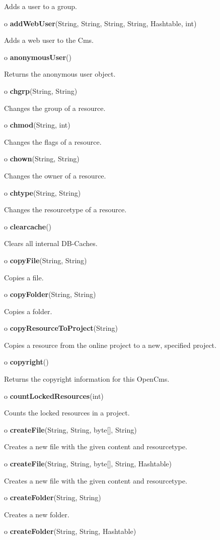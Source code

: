 \begin{description}
Adds a user to a group.  
\item o {\bf addWebUser}(String, String, String, String, Hashtable, int)  

Adds a web user to the Cms.  
\item o {\bf anonymousUser}()  

Returns the anonymous user object.  
\item o {\bf chgrp}(String, String)  

Changes the group of a resource.  
\item o {\bf chmod}(String, int)  

Changes the flags of a resource.  
\item o {\bf chown}(String, String)  

Changes the owner of a resource.  
\item o {\bf chtype}(String, String)  

Changes the resourcetype of a resource.  
\item o {\bf clearcache}()  

Clears all internal DB-Caches.  
\item o {\bf copyFile}(String, String)  

Copies a file.  
\item o {\bf copyFolder}(String, String)  

Copies a folder.  
\item o {\bf copyResourceToProject}(String)  

Copies a resource from the online project to a new, specified project.  
\item o {\bf copyright}()  

Returns the copyright information for this OpenCms.  
\item o {\bf countLockedResources}(int)  

Counts the locked resources in a project.  
\item o {\bf createFile}(String, String, byte[], String)  

Creates a new file with the given content and resourcetype.\htmlBR
\item o {\bf createFile}(String, String, byte[], String, Hashtable)  

Creates a new file with the given content and resourcetype.  
\item o {\bf createFolder}(String, String)  

Creates a new folder.  
\item o {\bf createFolder}(String, String, Hashtable)  


\end{description}
